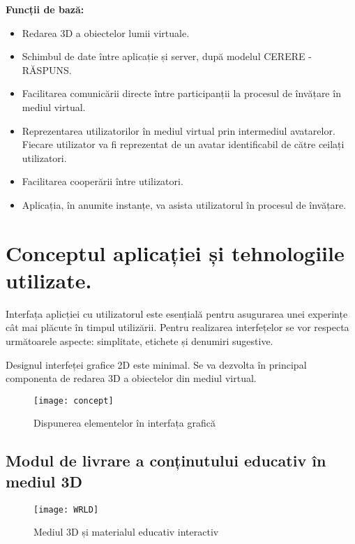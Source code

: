 \textbf{Funcții de bază:}
\begin{itemize}
\item Redarea 3D a obiectelor lumii virtuale.
\item Schimbul de date între aplicație și server, după modelul CERERE - RĂSPUNS.
\item Facilitarea comunicării directe între participanții la procesul de învățare în mediul virtual.
\item Reprezentarea utilizatorilor în mediul virtual prin intermediul avatarelor. Fiecare utilizator va fi reprezentat de un avatar identificabil de către ceilați utilizatori.
\item Facilitarea cooperării între utilizatori.
\item Aplicația, în anumite instanțe, va asista utilizatorul în procesul de învățare. 
\end{itemize}

\section{Conceptul aplicației și tehnologiile utilizate.}

\par Interfața aplicției cu utilizatorul este esențială pentru asugurarea unei experințe cât mai plăcute în timpul utilizării. Pentru realizarea interfețelor se vor respecta următoarele aspecte: simplitate, etichete și denumiri sugestive.
\par Designul interfeței grafice 2D este minimal. Se va dezvolta în principal componenta de redarea 3D a obiectelor din mediul virtual.

\begin{figure}[ht]
    \centering
    \texttt{[image: concept]}
    \caption{Dispunerea elementelor în interfața grafică}
    \label{fig:vorldd}
\end{figure}

\newpage
\subsection{Modul de livrare a conținutului educativ în mediul 3D}

\begin{figure}[ht]
    \centering
    \texttt{[image: WRLD]}
    \caption{Mediul 3D și materialul educativ interactiv}
    \label{fig:vorldd}
\end{figure}

\newpage

